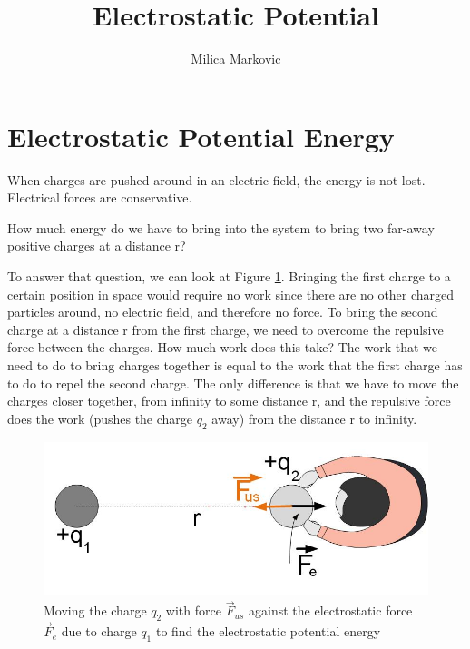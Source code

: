 \documentclass{ximera}
\title{Electrostatic Potential}
\author{Milica Markovic}
\begin{document}
  
\begin{abstract}  

\end{abstract}  
\maketitle    






\section{Electrostatic Potential Energy}


When charges are pushed around in an electric field, the energy is not lost. Electrical forces are conservative. 


How much energy do we have to bring into the system to bring two far-away positive charges at a distance r?

To answer that question, we can look at Figure \ref{Potential1}. Bringing the first charge to a certain position in space would require no work since there are no other charged particles around, no electric field, and therefore no force.  To bring the second charge at a distance r from the first charge, we need to overcome the repulsive force between the charges. How much work does this take? 
The work that we need to do to bring charges together is equal to the work that the first charge has to do to repel the second charge. The only difference is that we have to move the charges closer together, from infinity to some distance r, and the repulsive force does the work (pushes the charge $q_2$ away) from the distance r to infinity.



\begin{figure}[htbp]
\begin{center}
\includegraphics[scale=0.5]{../jpg/Two_Static_Charges_Potential.jpg}
\end{center}
\caption{Moving the charge $q_2$ with force $\vec{F}_{us}$ against the electrostatic force $\vec{F}_e$ due to charge $q_1$ to find the electrostatic potential energy}\label{Potential1}
\end{figure}
\end{document}
